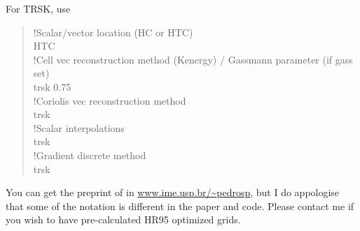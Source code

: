 \documentclass[a4paper,10pt]{article}
\begin{document}
For TRSK, use
\begin{verse}
!Scalar/vector location (HC or HTC) \\
HTC \\
!Cell vec reconstruction method (Kenergy) / Gassmann parameter (if gass set) \\
trsk 0.75 \\
!Coriolis vec reconstruction method \\
trsk \\
!Scalar interpolations \\
trsk \\
!Gradient discrete method \\
trsk \\
\end{verse}

You can get the preprint of \cite{Peixoto2015} in \url{www.ime.usp.br/~pedrosp}, but I do appologise that some of the notation is different in the paper and code. Please contact me if you wish to have pre-calculated HR95 optimized grids.


\end{document}
